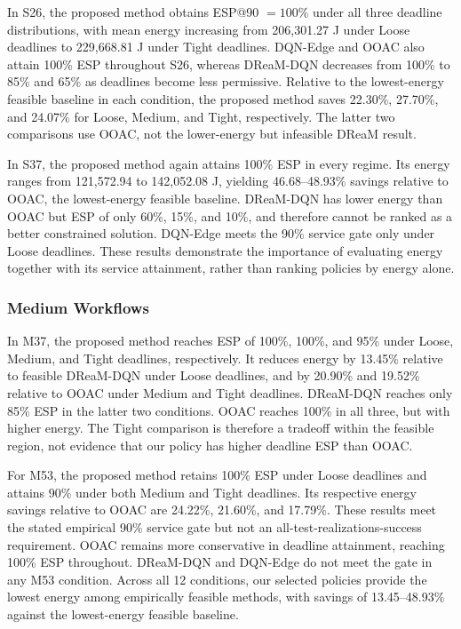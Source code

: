 In S26, the proposed method obtains ESP@90 $=100\%$ under all three
deadline distributions, with mean energy increasing from 206,301.27 J
under Loose deadlines to 229,668.81 J under Tight deadlines.
DQN-Edge and OOAC also attain 100\% ESP throughout S26, whereas
DReaM-DQN decreases from 100\% to 85\% and 65\% as deadlines become
less permissive. Relative to the lowest-energy feasible baseline in
each condition, the proposed method saves 22.30\%, 27.70\%, and
24.07\% for Loose, Medium, and Tight, respectively. The latter two
comparisons use OOAC, not the lower-energy but infeasible DReaM result.

In S37, the proposed method again attains 100\% ESP in every regime.
Its energy ranges from 121,572.94 to 142,052.08 J, yielding
46.68--48.93\% savings relative to OOAC, the lowest-energy feasible
baseline. DReaM-DQN has lower energy than OOAC but ESP of only
60\%, 15\%, and 10\%, and therefore cannot be ranked as a better
constrained solution. DQN-Edge meets the 90\% service gate only under
Loose deadlines. These results demonstrate the importance of
evaluating energy together with its service attainment, rather than
ranking policies by energy alone.

\subsubsection{Medium Workflows}

In M37, the proposed method reaches ESP of 100\%, 100\%, and 95\%
under Loose, Medium, and Tight deadlines, respectively. It reduces
energy by 13.45\% relative to feasible DReaM-DQN under Loose deadlines,
and by 20.90\% and 19.52\% relative to OOAC under Medium and Tight
deadlines. DReaM-DQN reaches only 85\% ESP in the latter two conditions.
OOAC reaches 100\% in all three, but with higher energy. The Tight
comparison is therefore a tradeoff within the feasible region, not
evidence that our policy has higher deadline ESP than OOAC.

For M53, the proposed method retains 100\% ESP under Loose deadlines
and attains 90\% under both Medium and Tight deadlines. Its respective
energy savings relative to OOAC are 24.22\%, 21.60\%, and 17.79\%.
These results meet the stated empirical 90\% service gate but not an
all-test-realizations-success requirement. OOAC remains more
conservative in deadline attainment, reaching 100\% ESP throughout.
DReaM-DQN and DQN-Edge do not meet the gate in any M53 condition.
Across all 12 conditions, our selected policies provide the lowest
energy among empirically feasible methods, with savings of
13.45--48.93\% against the lowest-energy feasible baseline.

